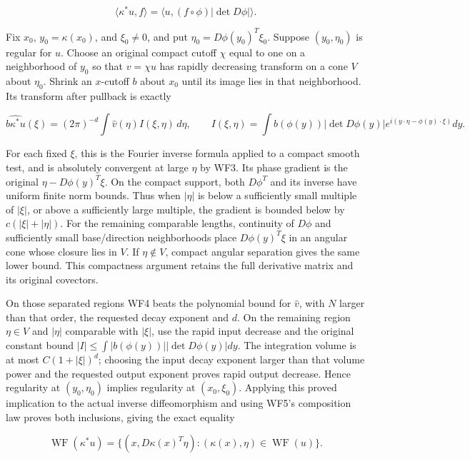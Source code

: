 \documentclass[
  11pt,
]{article}
\begin{document}
\[
\langle\kappa^*u,f\rangle
 =\langle u,(f\circ\phi)|\det D\phi|\rangle.
\tag{WF5}
\]

Fix \(x_0\), \(y_0=\kappa(x_0)\), and \(\xi_0\ne0\), and put
\(\eta_0=D\phi(y_0)^T\xi_0\). Suppose \((y_0,\eta_0)\) is regular for
\(u\). Choose an original compact cutoff \(\chi\) equal to one on a
neighborhood of \(y_0\) so that \(v=\chi u\) has rapidly decreasing
transform on a cone \(V\) about \(\eta_0\). Shrink an \(x\)-cutoff \(b\)
about \(x_0\) until its image lies in that neighborhood. Its transform
after pullback is exactly

\[
\widehat{b\kappa^*u}(\xi)
=(2\pi)^{-d}\int\widehat v(\eta)I(\xi,\eta)\,d\eta,\qquad
I(\xi,\eta)=\int b(\phi(y))|\det D\phi(y)|
        e^{i(y\cdot\eta-\phi(y)\cdot\xi)}dy.
\tag{WF6}
\]

For each fixed \(\xi\), this is the Fourier inverse formula applied to a
compact smooth test, and is absolutely convergent at large \(\eta\) by
WF3. Its phase gradient is the original \(\eta-D\phi(y)^T\xi\). On the
compact support, both \(D\phi^T\) and its inverse have uniform finite
norm bounds. Thus when \(|\eta|\) is below a sufficiently small multiple
of \(|\xi|\), or above a sufficiently large multiple, the gradient is
bounded below by \(c(|\xi|+|\eta|)\). For the remaining comparable
lengths, continuity of \(D\phi\) and sufficiently small base/direction
neighborhoods place \(D\phi(y)^T\xi\) in an angular cone whose closure
lies in \(V\). If \(\eta\notin V\), compact angular separation gives the
same lower bound. This compactness argument retains the full derivative
matrix and its original covectors.

On those separated regions WF4 beats the polynomial bound for
\(\widehat v\), with \(N\) larger than that order, the requested decay
exponent and \(d\). On the remaining region \(\eta\in V\) and \(|\eta|\)
comparable with \(|\xi|\), use the rapid input decrease and the original
constant bound \(|I|\leq\int|b(\phi(y))||\det D\phi(y)|dy\). The
integration volume is at most \(C(1+|\xi|)^d\); choosing the input decay
exponent larger than that volume power and the requested output exponent
proves rapid output decrease. Hence regularity at \((y_0,\eta_0)\)
implies regularity at \((x_0,\xi_0)\). Applying this proved implication
to the actual inverse diffeomorphism and using WF5's composition law
proves both inclusions, giving the exact equality

\[
\operatorname{WF}(\kappa^*u)
 =\{(x,D\kappa(x)^T\eta):(\kappa(x),\eta)\in\operatorname{WF}(u)\}.
\tag{WF7}
\]
\end{document}
